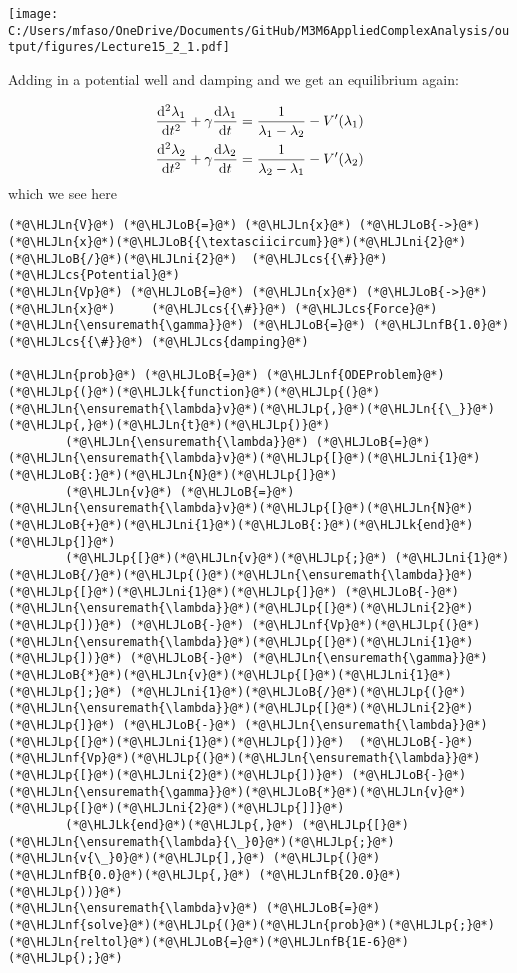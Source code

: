 \documentclass[12pt,a4paper]{article}
\newcommand{\HLJLk}[1]{\textcolor[RGB]{148,91,176}{\textbf{#1}}}
\newcommand{\HLJLn}[1]{#1}
\newcommand{\HLJLnf}[1]{\textcolor[RGB]{66,102,213}{#1}}
\newcommand{\HLJLnfB}[1]{\textcolor[RGB]{59,151,46}{#1}}
\newcommand{\HLJLni}[1]{\textcolor[RGB]{59,151,46}{#1}}
\newcommand{\HLJLoB}[1]{\textcolor[RGB]{102,102,102}{\textbf{#1}}}
\newcommand{\HLJLp}[1]{#1}
\newcommand{\HLJLcs}[1]{\textcolor[RGB]{153,153,119}{\textit{#1}}}
\def\D{ {\rm d} }
\def\dt{\D t}
\begin{document}
\texttt{[image: C:/Users/mfaso/OneDrive/Documents/GitHub/M3M6AppliedComplexAnalysis/output/figures/Lecture15\_2\_1.pdf]}

Adding in a potential well and damping and we get an equilibrium again:


\begin{align*}
{\D^2 \lambda_1 \over \D t^2} + \gamma {\D \lambda_1 \over \dt} = {1 \over \lambda_1 -\lambda_2} - V'(\lambda_1) \\
{\D^2 \lambda_2 \over \D t^2}+ \gamma {\D \lambda_2 \over \dt} = {1 \over \lambda_2 -\lambda_1} - V'(\lambda_2)
\end{align*}
which we see here


\begin{lstlisting}
(*@\HLJLn{V}@*) (*@\HLJLoB{=}@*) (*@\HLJLn{x}@*) (*@\HLJLoB{->}@*) (*@\HLJLn{x}@*)(*@\HLJLoB{{\textasciicircum}}@*)(*@\HLJLni{2}@*)(*@\HLJLoB{/}@*)(*@\HLJLni{2}@*)  (*@\HLJLcs{{\#}}@*) (*@\HLJLcs{Potential}@*)
(*@\HLJLn{Vp}@*) (*@\HLJLoB{=}@*) (*@\HLJLn{x}@*) (*@\HLJLoB{->}@*) (*@\HLJLn{x}@*)     (*@\HLJLcs{{\#}}@*) (*@\HLJLcs{Force}@*)
(*@\HLJLn{\ensuremath{\gamma}}@*) (*@\HLJLoB{=}@*) (*@\HLJLnfB{1.0}@*)    (*@\HLJLcs{{\#}}@*) (*@\HLJLcs{damping}@*)

(*@\HLJLn{prob}@*) (*@\HLJLoB{=}@*) (*@\HLJLnf{ODEProblem}@*)(*@\HLJLp{(}@*)(*@\HLJLk{function}@*)(*@\HLJLp{(}@*)(*@\HLJLn{\ensuremath{\lambda}v}@*)(*@\HLJLp{,}@*)(*@\HLJLn{{\_}}@*)(*@\HLJLp{,}@*)(*@\HLJLn{t}@*)(*@\HLJLp{)}@*)
        (*@\HLJLn{\ensuremath{\lambda}}@*) (*@\HLJLoB{=}@*) (*@\HLJLn{\ensuremath{\lambda}v}@*)(*@\HLJLp{[}@*)(*@\HLJLni{1}@*)(*@\HLJLoB{:}@*)(*@\HLJLn{N}@*)(*@\HLJLp{]}@*)
        (*@\HLJLn{v}@*) (*@\HLJLoB{=}@*) (*@\HLJLn{\ensuremath{\lambda}v}@*)(*@\HLJLp{[}@*)(*@\HLJLn{N}@*)(*@\HLJLoB{+}@*)(*@\HLJLni{1}@*)(*@\HLJLoB{:}@*)(*@\HLJLk{end}@*)(*@\HLJLp{]}@*)
        (*@\HLJLp{[}@*)(*@\HLJLn{v}@*)(*@\HLJLp{;}@*) (*@\HLJLni{1}@*)(*@\HLJLoB{/}@*)(*@\HLJLp{(}@*)(*@\HLJLn{\ensuremath{\lambda}}@*)(*@\HLJLp{[}@*)(*@\HLJLni{1}@*)(*@\HLJLp{]}@*) (*@\HLJLoB{-}@*) (*@\HLJLn{\ensuremath{\lambda}}@*)(*@\HLJLp{[}@*)(*@\HLJLni{2}@*)(*@\HLJLp{])}@*) (*@\HLJLoB{-}@*) (*@\HLJLnf{Vp}@*)(*@\HLJLp{(}@*)(*@\HLJLn{\ensuremath{\lambda}}@*)(*@\HLJLp{[}@*)(*@\HLJLni{1}@*)(*@\HLJLp{])}@*) (*@\HLJLoB{-}@*) (*@\HLJLn{\ensuremath{\gamma}}@*)(*@\HLJLoB{*}@*)(*@\HLJLn{v}@*)(*@\HLJLp{[}@*)(*@\HLJLni{1}@*)(*@\HLJLp{];}@*) (*@\HLJLni{1}@*)(*@\HLJLoB{/}@*)(*@\HLJLp{(}@*)(*@\HLJLn{\ensuremath{\lambda}}@*)(*@\HLJLp{[}@*)(*@\HLJLni{2}@*)(*@\HLJLp{]}@*) (*@\HLJLoB{-}@*) (*@\HLJLn{\ensuremath{\lambda}}@*)(*@\HLJLp{[}@*)(*@\HLJLni{1}@*)(*@\HLJLp{])}@*)  (*@\HLJLoB{-}@*) (*@\HLJLnf{Vp}@*)(*@\HLJLp{(}@*)(*@\HLJLn{\ensuremath{\lambda}}@*)(*@\HLJLp{[}@*)(*@\HLJLni{2}@*)(*@\HLJLp{])}@*) (*@\HLJLoB{-}@*) (*@\HLJLn{\ensuremath{\gamma}}@*)(*@\HLJLoB{*}@*)(*@\HLJLn{v}@*)(*@\HLJLp{[}@*)(*@\HLJLni{2}@*)(*@\HLJLp{]]}@*)
        (*@\HLJLk{end}@*)(*@\HLJLp{,}@*) (*@\HLJLp{[}@*)(*@\HLJLn{\ensuremath{\lambda}{\_}0}@*)(*@\HLJLp{;}@*) (*@\HLJLn{v{\_}0}@*)(*@\HLJLp{],}@*) (*@\HLJLp{(}@*)(*@\HLJLnfB{0.0}@*)(*@\HLJLp{,}@*) (*@\HLJLnfB{20.0}@*)(*@\HLJLp{))}@*)
(*@\HLJLn{\ensuremath{\lambda}v}@*) (*@\HLJLoB{=}@*) (*@\HLJLnf{solve}@*)(*@\HLJLp{(}@*)(*@\HLJLn{prob}@*)(*@\HLJLp{;}@*) (*@\HLJLn{reltol}@*)(*@\HLJLoB{=}@*)(*@\HLJLnfB{1E-6}@*)(*@\HLJLp{);}@*)


\end{lstlisting}
\end{document}
